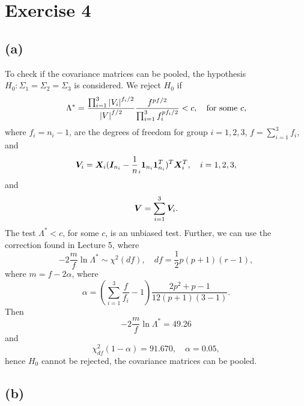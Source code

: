 \section*{Exercise 4}
\label{sec:exercise-4}

\subsection*{(a)}
\label{sec:a-3}

To check if the covariance matrices can be pooled, the hypothesis
$H_{0}: \Sigma_{1} =\Sigma_{2}  = \Sigma_{3}$ is considered. We
reject $H_{0}$ if
\begin{equation*}
  \Lambda^* = \frac{\prod_{i = 1}^{3} \left| V_i \right|^{f_i/2}}{\left| V \right|^{f/2}}
  \frac{f^{pf/2}}{\prod_{i = 1}^{3} f_i ^{pf_{i}/2}} < c,\quad
  \text{for some } c,
\end{equation*}
where $f_{i} = n_{i} - 1$, are the degrees of freedom for group $i = 1,
2, 3$, $f = \sum_{i=1}^{3}f_{i}$, and
\begin{equation*}
  \bm{V}_{i} = \bm{X}_{i} (\bm{I}_{n_{i}}  - \frac 1n_{i}\bm{1}_{n_{i}} \bm{1}_{n_{i}}^{T})^{T}
  \bm{X}_{i}^{T},\quad i = 1,2,3,
\end{equation*}
and
\begin{equation*}
  \bm{V} = \sum_{i=1}^{3} \bm{V}_{i}.
\end{equation*}
The test $\Lambda^{*} < c$, for some $c$, is an unbiased test.
Further, we can use the correction found in Lecture 5, where
\begin{equation*}
  -2 \frac{m}{f} \ln \Lambda^{*} \sim \chi^{2}(df), \quad df = \frac{1}{2}p(p+1)(r-1),
\end{equation*}
where $m = f- 2\alpha$, where
\begin{equation*}
  \alpha = 
  \left(
    \sum_{i = 1}^{3} \frac{f}{f_{i}} - 1
  \right)
  \frac{2p^{2} + p -1}{12(p+1)(3-1)}.
\end{equation*}
Then 
\begin{equation*}
   -2 \frac{m}{f} \ln \Lambda^{*} = 49.26
\end{equation*}
and
\begin{equation*}
  \chi_{df}^{2}(1-\alpha) = 91.670, \quad \alpha = 0.05,
\end{equation*}
hence $H_{0}$ cannot be rejected, the covariance matrices can be
pooled. 
\subsection*{(b)}
\label{sec:b-3}

